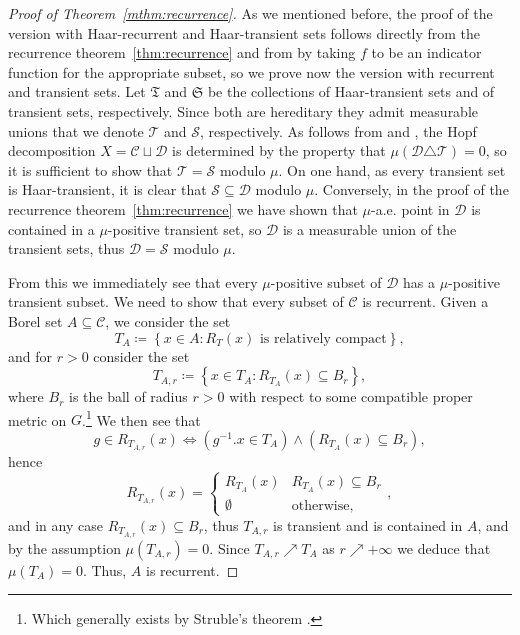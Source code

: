 \documentclass{amsart}
\numberwithin{equation}{subsection}
\begin{document}
\begin{proof}[Proof of Theorem~\ref{mthm:recurrence}]
As we mentioned before, the proof of the version with Haar-recurrent and Haar-transient sets follows directly from the recurrence theorem~\ref{thm:recurrence} and from  by taking \(f\) to be an indicator function for the appropriate subset, so we prove now the version with recurrent and transient sets. Let \(\mathfrak{T}\) and \(\mathfrak{S}\) be the collections of Haar-transient sets and of transient sets, respectively. Since both are hereditary they admit measurable unions that we denote \(\mathcal{T}\) and \(\mathcal{S}\), respectively. As follows from  and , the Hopf decomposition \(X=\mathcal{C}\sqcup\mathcal{D}\) is determined by the property that \(\mu\left(\mathcal{D}\triangle\mathcal{T}\right)=0\), so it is sufficient to show that \(\mathcal{T}=\mathcal{S}\) modulo \(\mu\). On one hand, as every transient set is Haar-transient, it is clear that \(\mathcal{S}\subseteq\mathcal{D}\) modulo \(\mu\). Conversely, in the proof of the recurrence theorem~\ref{thm:recurrence} we have shown that \(\mu\)-a.e. point in \(\mathcal{D}\) is contained in a \(\mu\)-positive transient set, so \(\mathcal{D}\) is a measurable union of the transient sets, thus \(\mathcal{D}=\mathcal{S}\) modulo \(\mu\).

From this we immediately see that every \(\mu\)-positive subset of \(\mathcal{D}\) has a \(\mu\)-positive transient subset. We need to show that every subset of \(\mathcal{C}\) is recurrent. Given a Borel set \(A\subseteq \mathcal{C}\), we consider the set
\[T_{A}\coloneqq \left\{x\in A: R_{T}\left(x\right)\text{ is relatively compact}\right\},\]
and for \(r>0\) consider the set
\[T_{A,r}\coloneqq \left\{ x\in T_{A}:R_{T_{A}}\left(x\right)\subseteq B_{r}\right\},\]
where \(B_{r}\) is the ball of radius \(r>0\) with respect to some compatible proper metric on \(G\).\footnote{Which generally exists by Struble's theorem \cite{struble1974metrics}.} We then see that
\[g\in R_{T_{A,r}}\left(x\right)\iff\left(g^{-1}.x\in T_{A}\right)\wedge\left(R_{T_{A}}\left(x\right)\subseteq B_{r}\right),\]
hence
\[R_{T_{A,r}}\left(x\right)=\begin{cases}
R_{T_{A}}\left(x\right) & R_{T_{A}}\left(x\right)\subseteq B_{r}\\
\emptyset & \text{otherwise},
\end{cases},\]
and in any case \(R_{T_{A,r}}\left(x\right)\subseteq B_{r}\), thus \(T_{A,r}\) is transient and is contained in \(A\), and by the assumption \(\mu\left(T_{A,r}\right)=0\). Since \(T_{A,r}\nearrow T_{A}\) as \(r\nearrow +\infty\) we deduce that \(\mu\left(T_{A}\right)=0\). Thus, \(A\) is recurrent.
\end{proof}
\end{document}
